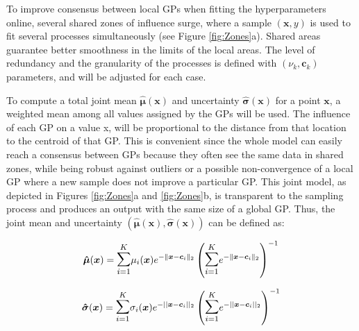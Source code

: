 \documentclass[journal]{IEEEtran}
\newcommand\vect[1]{\boldsymbol{#1}}
\begin{document}
To improve consensus between local GPs when fitting the hyperparameters online, several shared zones of influence surge, where a sample $(\vect{x},y)$ is used to fit several processes simultaneously (see Figure \ref{fig:Zones}a). Shared areas guarantee better smoothness in the limits of the local areas. 
The level of redundancy and the granularity of the processes is defined with $(\nu_k, \vect{c}_k)$ parameters, and will be adjusted for each case.

To compute a total joint mean $\vect{\hat \mu}(\vect{x})$ and uncertainty $\vect{\hat \sigma}(\vect{x})$ for a point $\vect{x}$, a weighted mean among all values assigned by the GPs will be used. 
The influence of each GP on a value x, will be proportional to the distance from that location to the centroid of that GP. This is convenient since the whole model can easily reach a consensus between GPs because they often see the same data in shared zones, while being robust against outliers or a possible non-convergence of a local GP where a new sample does not improve a particular GP. This joint model, as depicted in Figures \ref{fig:Zones}a and \ref{fig:Zones}b, is transparent to the sampling process and produces an output with the same size of a global GP. Thus, the joint mean and uncertainty $(\vect{\hat \mu}(\vect{x}), \vect{\hat \sigma}(\vect{x}))$ can be defined as:

\begin{equation}
\begin{aligned}
    \vect{\hat \mu}(\vect{x}) =
                        \mathlarger{\mathlarger{\sum}_{i = 1}^{K}} \mu_i(\vect{x}) e^{-\|\vect{x}-\vect{c}_i\|_2}
                        \left(\mathlarger{\mathlarger{\sum}_{i = 1}^{K}} e^{-\|\vect{x}-\vect{c}_i\|_2}\right)^{-1}
\end{aligned}
\end{equation}

\begin{equation}
\begin{aligned}
    \vect{\hat \sigma}(\vect{x}) = 
                        \mathlarger{\mathlarger{\sum}_{i = 1}^{K}} \sigma_i(\vect{x}) e^{-||\vect{x}-\vect{c}_i||_2}
                        \left(\mathlarger{\mathlarger{\sum}_{i = 1}^{K}} e^{-||\vect{x}-\vect{c}_i||_2}\right)^{-1}
\end{aligned}
\end{equation}
\end{document}
